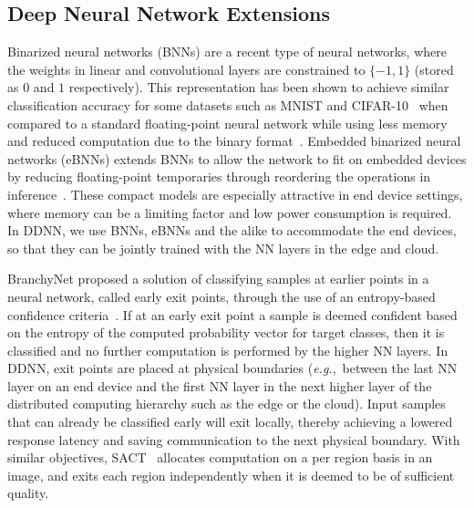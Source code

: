 \documentclass[10pt, conference, compsocconf]{IEEEtran}
\newcommand{\eg}{\emph{e.g.}}
\begin{document}
\subsection{Deep Neural Network Extensions}
Binarized neural networks (BNNs) are a recent type of neural networks, where the weights in linear and convolutional layers are constrained to $\{-1, 1\}$ (stored as $0$ and $1$ respectively). This representation has been shown to achieve similar classification accuracy for some datasets such as MNIST and CIFAR-10~\cite{rastegari2016xnor} when compared to a standard floating-point neural network while using less memory and reduced computation due to the binary format~\cite{courbariaux2015binaryconnect}. Embedded binarized neural networks (eBNNs) extends BNNs to allow the network to fit on embedded devices by reducing floating-point temporaries through reordering the operations in inference~\cite{mcdanel2016ebnn}. These compact models are especially attractive in end device settings, where memory can be a limiting factor and low power consumption is required. In DDNN, we use BNNs, eBNNs and the alike to accommodate the end devices, so that they can be jointly trained with the NN layers in the edge and cloud.

BranchyNet proposed a solution of classifying samples at earlier points in a neural network, called early exit points, through the use of an entropy-based confidence criteria~\cite{teerapittayanon2016branchynet}. If at an early exit point a sample is deemed confident based on the entropy of the computed probability vector for target classes, then it is classified and no further computation is performed by the higher NN layers. In DDNN, exit points are placed at physical boundaries (\eg,~between the last NN layer on an end device and the first NN layer in the next higher layer of the distributed computing hierarchy such as the edge or the cloud). Input samples that can already be classified early will exit locally, thereby achieving a lowered response latency and saving communication to the next physical boundary. With similar objectives, SACT~\cite{figurnov2016sact} allocates computation on a per region basis in an image, and exits each region independently when it is deemed to be of sufficient quality. 
\end{document}
